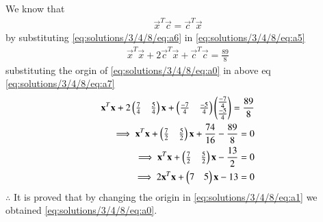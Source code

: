 We know that
\begin{align}
\vec{x}^T\vec{c} = \vec{c}^T\vec{x}
\label{eq:solutions/3/4/8/eq:a6}
\end{align}
by substituting \eqref{eq:solutions/3/4/8/eq:a6} in \eqref{eq:solutions/3/4/8/eq:a5}
\begin{align}
\vec{x}^T\vec{x}+2\vec{c}^T\vec{x}+\vec{c}^T\vec{c} = \frac{89}{8}
\label{eq:solutions/3/4/8/eq:a7}
\end{align}
substituting the orgin of \eqref{eq:solutions/3/4/8/eq:a0} in above eq \eqref{eq:solutions/3/4/8/eq:a7}
\begin{align}
\mathbf{x}^T\mathbf{x}+2\begin{pmatrix}\frac{7}{4}&\frac{5}{4}\end{pmatrix}\mathbf{x}+\begin{pmatrix}\frac{-7}{4}&\frac{-5}{4}\end{pmatrix}\begin{pmatrix}\frac{-7}{4}\\\frac{-5}{4}\end{pmatrix} = \frac{89}{8}\\
\implies \mathbf{x}^T\mathbf{x}+\begin{pmatrix}\frac{7}{2}&\frac{5}{2}\end{pmatrix}\mathbf{x}+\frac{74}{16}-\frac{89}{8} = 0\\
\implies \mathbf{x}^T\mathbf{x}+\begin{pmatrix}\frac{7}{2}&\frac{5}{2}\end{pmatrix}\mathbf{x}-\frac{13}{2} = 0\\
\implies 2\mathbf{x}^T\mathbf{x}+\begin{pmatrix}7&5\end{pmatrix}\mathbf{x}-13 = 0
\end{align}
$\therefore$ It is proved that by changing the origin in \eqref{eq:solutions/3/4/8/eq:a1} we obtained \eqref{eq:solutions/3/4/8/eq:a0}.
